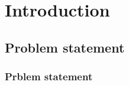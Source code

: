

% 

\section{Introduction}

\subsection{Problem statement}
\begin{frame}
  \frametitle{Prblem statement}
\end{frame}

% 